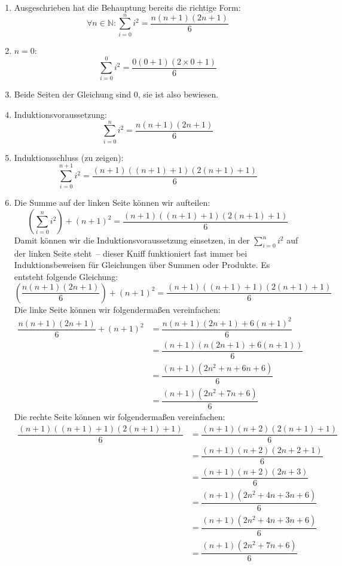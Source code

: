 \begin{enumerate}
\item Ausgeschrieben hat die Behauptung bereits die richtige Form:
\begin{displaymath}
  \forall n\in\mathbb{N}: \sum_{i=0}^n i^2 = \dfrac{n(n+1)(2n+1)}{6}
\end{displaymath}
\item $n=0$:
\begin{displaymath}
  \sum_{i=0}^0 i^2 = \dfrac{0(0+1)(2\times 0 + 1)}{6}
\end{displaymath}
\item Beide Seiten der Gleichung sind $0$, sie ist also bewiesen.
\item Induktionsvoraussetzung:
%
\begin{displaymath}
  \sum_{i=0}^n i^2 = \dfrac{n(n+1)(2n+1)}{6}
\end{displaymath}
\item Induktionsschluss (zu zeigen):
\begin{displaymath}
  \sum_{i=0}^{n+1} i^2 = \dfrac{(n+1)((n+1)+1)(2(n+1)+1)}{6}
\end{displaymath}
\item Die Summe auf der linken Seite können wir aufteilen:
%
\begin{displaymath}
  (\sum_{i=0}^{n} i^2) + (n+1)^2  = \dfrac{(n+1)((n+1)+1)(2(n+1)+1)}{6}
\end{displaymath}
%
Damit können wir die Induktionsvoraussetzung einsetzen, in der
$\sum_{i=0}^{n} i^2$ auf der linken Seite steht~-- dieser Kniff
funktioniert fast immer bei Induktionsbeweisen für Gleichungen über
Summen oder Produkte.  Es entsteht folgende Gleichung:
%
\begin{displaymath}
  (\dfrac{n(n+1)(2n+1)}{6}) + (n+1)^2  =
  \dfrac{(n+1)((n+1)+1)(2(n+1)+1)}{6}
\end{displaymath}
%
Die linke Seite können wir folgendermaßen vereinfachen:
%
\begin{displaymath}
\begin{split}
  \dfrac{n(n+1)(2n+1)}{6} + (n+1)^2  &=
  \dfrac{n(n+1)(2n+1) + 6(n+1)^2}{6} \\ &=
  \dfrac{(n+1)(n(2n+1) + 6(n+1))}{6} \\ &=
  \dfrac{(n+1)(2n^2+n + 6n+6)}{6} \\ &=
  \dfrac{(n+1)(2n^2+  7n+6)}{6}
\end{split}
\end{displaymath}
%
Die rechte Seite können wir folgendermaßen vereinfachen:
%
\begin{displaymath}
  \begin{split}
  \dfrac{(n+1)((n+1)+1)(2(n+1)+1)}{6} &=
  \dfrac{(n+1)(n+2)(2(n+1)+1)}{6} \\ &=
  \dfrac{(n+1)(n+2)(2n+2+1)}{6} \\ &=
  \dfrac{(n+1)(n+2)(2n+3)}{6} \\ &=
  \dfrac{(n+1)(2n^2 + 4n + 3n + 6)}{6} \\ &=
  \dfrac{(n+1)(2n^2 + 4n + 3n + 6)}{6} \\ &=
  \dfrac{(n+1)(2n^2 + 7n + 6)}{6}
\end{split}
\end{displaymath}
\end{enumerate}
